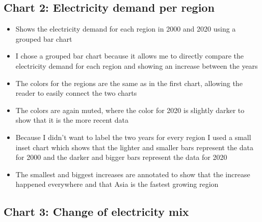 \documentclass{article}
\begin{document}
\subsection{Chart 2: Electricity demand per region}

\begin{itemize}
    \item Shows the electricity demand for each region in 2000 and 2020 using a grouped bar chart
    \item I chose a grouped bar chart because it allows me to directly compare the electricity demand for each region and showing an increase between the years
    \item The colors for the regions are the same as in the first chart, allowing the reader to easily connect the two charts
    \item The colors are again muted, where the color for 2020 is slightly darker to show that it is the more recent data
    \item Because I didn't want to label the two years for every region I used a small inset chart which shows that the lighter and smaller bars represent the data for 2000 and the darker and bigger bars represent the data for 2020
    \item The smallest and biggest increases are annotated to show that the increase happened everywhere and that Asia is the fastest growing region
\end{itemize}

\subsection{Chart 3: Change of electricity mix}
\end{document}
